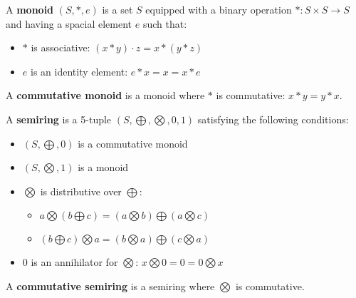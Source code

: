 
\begin{definition}[Monoid]
    A \textbf{monoid} $(S, *, e)$ is a set $S$ equipped with a binary operation $* : S \times S \rightarrow S$ and having a spacial element $e$ such that:
    \begin{itemize}
        \item {$*$ is associative:} $ (x * y) \cdot z = x * (y * z)$
        \item {$e$ is an identity element:} $  e * x = x = x * e$
    \end{itemize}
    A \textbf{commutative monoid} is a monoid where $*$ is commutative: $x * y = y * x$.
\end{definition}

\begin{definition}[Semiring]
    \label{def_semiring}
        A \textbf{semiring} is a 5-tuple $(S,\bigoplus,\bigotimes,0,1)$ satisfying the following conditions:
         \begin{itemize}
            \item {$(S,\bigoplus,0)$ is a commutative monoid} 
            \item {$(S,\bigotimes,1)$ is a monoid} 
            \item {$\bigotimes$ is distributive over $\bigoplus$:}
            \begin{itemize}
                \item $a \bigotimes ( b \bigoplus c) = (a \bigotimes b) \bigoplus (a \bigotimes c)$ 
                \item $(b \bigoplus c) \bigotimes a = (b \bigotimes a) \bigoplus (c \bigotimes a)$
            \end{itemize} 
            \item {0 is an annihilator for $\bigotimes$:} $x \bigotimes 0= 0 =  0 \bigotimes x $
        \end{itemize}
        A \textbf{commutative semiring} is a semiring where $\bigotimes$ is commutative.
\end{definition}

